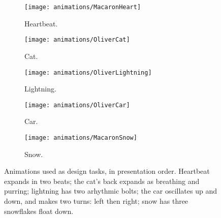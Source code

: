 
\newcommand{\animationHeight}{0.75in}
 \newcommand{\animationWidth}{0.27\textwidth}

\begin{figure}[htb]
    \small
    \centering
    \begin{subfigure}{0.18\textwidth}
            \centering
            \texttt{[image: animations/MacaronHeart]}
    	   \caption{Heartbeat.}
    	   \label{fig:animation:heartbeat}
    \end{subfigure}
    \begin{subfigure}{0.18\textwidth}
            \centering
            \texttt{[image: animations/OliverCat]}
    	   \caption{Cat.}
    	   \label{fig:animation:cat}
    \end{subfigure}
    \begin{subfigure}{0.18\textwidth}
            \centering
            \texttt{[image: animations/OliverLightning]}
    	   \caption{Lightning.}
    	   \label{fig:animation:lightning}
    \end{subfigure}
    \begin{subfigure}{0.18\textwidth}
            \centering
            \texttt{[image: animations/OliverCar]}
    	   \caption{Car.}
    	   \label{fig:animation:car}
    \end{subfigure}
    \begin{subfigure}{0.18\textwidth}
            \centering
            \texttt{[image: animations/MacaronSnow]}
    	   \caption{Snow.}
    	   \label{fig:animation:snow}
    \end{subfigure}
    
    \caption{Animations used as design tasks, in presentation order. Heartbeat expands in two beats; the cat's back expands as breathing and purring; lightning has two arhythmic bolts; the car oscillates up and down, and makes two turns: left then right; snow has three snowflakes float down.
    }
    \label{fig:animation}
\end{figure}



